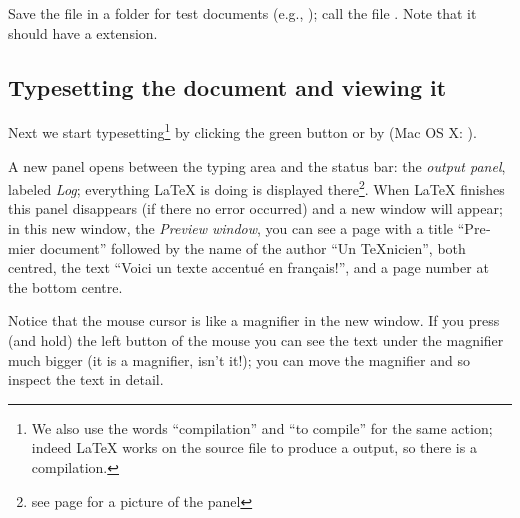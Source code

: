 
Save the file in a folder for test documents (e.g., ); call the file . Note that it should have a  extension.

\subsection{Typesetting the document and viewing it}

Next we start typesetting\footnote{We also use the words ``compilation'' and ``to compile'' for the same action; indeed {\LaTeX} works on the source file to produce a  output, so there is a compilation.} by clicking the green button 
or by  (Mac OS X: ).

A new panel opens between the typing area and the status bar: the \emph{output panel}, labeled \emph{Log}; everything {\LaTeX} is doing is displayed there\footnote{see page \pageref{fig:consoleOutput} for a picture of the panel}. When {\LaTeX} finishes this panel disappears (if there no error occurred) and a new window will appear; in this new window, the \emph{Preview window}, you can see a page with a title \foreignlanguage{french}{``Premier document''} followed by the name of the author \foreignlanguage{french}{``Un TeXnicien''}, both centred, the text
\foreignlanguage{french}{``Voici un texte accentué en français!''}, and a page number at the bottom centre.

Notice that the mouse cursor is like a magnifier in the new window. If you press (and hold) the left button of the mouse you can see the text under the magnifier much bigger (it is a magnifier, isn't it!); you can move the magnifier and so inspect the text in detail.

